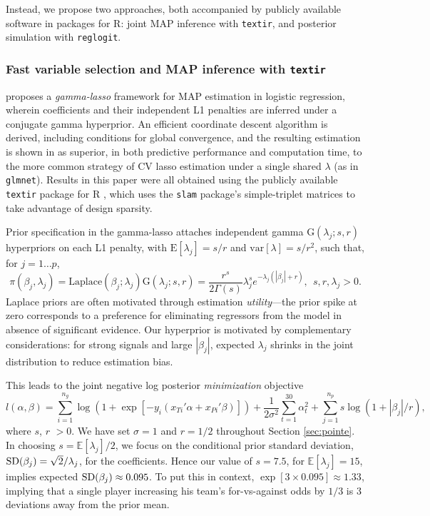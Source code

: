 Instead, we propose two approaches, both accompanied by publicly
available software in packages for {\sf R}:  joint MAP inference with
{\tt textir}, and posterior simulation with {\tt reglogit}.

\subsubsection{Fast variable selection and MAP inference with {\tt textir}}

\cite{taddy:2012} proposes a {\it gamma-lasso} framework for MAP
estimation in logistic regression, wherein coefficients and their
independent L1 penalties are inferred under a conjugate gamma
hyperprior.  An efficient coordinate descent algorithm is derived,
including conditions for global convergence, and the resulting
estimation is shown in \cite{taddy:2012} as superior, in both
predictive performance and computation time, to the more common
strategy of CV lasso estimation under a single shared $\lambda$ (as in
{\tt glmnet}).  Results in this paper were all obtained using the
publicly available {\tt textir} package for {\sf R} \cite {textir},
which uses the {\tt slam} \cite{slam} package's simple-triplet
matrices to take advantage of design sparsity.

Prior specification in the gamma-lasso attaches independent gamma
$\mathrm{G}(\lambda_j; s,r)$ hyperpriors on each L1 penalty, with
$\mathrm{E}[\lambda_j] = s/r$ and $\mathrm{var}[\lambda] = s/r^2$,
such that, for $j=1\ldots p$,
\begin{equation}\label{eq:glmodel}
  \pi(\beta_j, \lambda_j) = \mathrm{Laplace}(\beta_j;
  \lambda_j)\mathrm{G}(\lambda_j; s,r) =
  \frac{r^s}{2\Gamma(s)}\lambda_{j}^s e^{-\lambda_{j} \left(|\beta_j|+r\right)},~~s,r,\lambda_j>0.
\end{equation}
Laplace priors are often motivated through estimation {\it
  utility}---the prior spike at zero corresponds to a preference for
eliminating regressors from the model in absence of significant
evidence. Our hyperprior is motivated by complementary
considerations: for strong signals and large $|\beta_j|$, expected
$\lambda_j$ shrinks in the joint distribution to reduce estimation
bias.

This leads to the joint negative log posterior {\it minimization}
objective
\begin{equation}\label{eq:pp}
 l(\alpha,\beta)= 
  \sum_{i=1}^{n_g} \log \left ( 1 + \exp\left[- y_i (x_{Ti}' \alpha
      + x_{Pi}' \beta) \right ] \right ) +
 \frac{1}{2\sigma^2}\sum_{t=1}^{30}
\alpha_t^2 + \sum_{j=1}^{n_p}s\log(1+ |\beta_j|/r),
\end{equation}
where $s$, $r$ $>0$.  We have set $\sigma = 1$ and $r=1/2$ throughout
Section \ref{sec:pointe}. In choosing $s=\mathbb{E}[\lambda_j]/2$, we focus on the
conditional prior standard deviation, ${\rm SD}(\beta_j) = \sqrt{2}/\lambda_j$,
for the coefficients.  Hence our value of $s=7.5$, for
$\mathbb{E}[\lambda_j] = 15$, implies expected ${\rm SD}(\beta_j) \approx
0.095$.  To put this in context, $\exp[3\times 0.095] \approx 1.33$,
implying that a single player increasing his team's for-vs-against
odds by $1/3$ is 3 deviations away from the prior mean.

